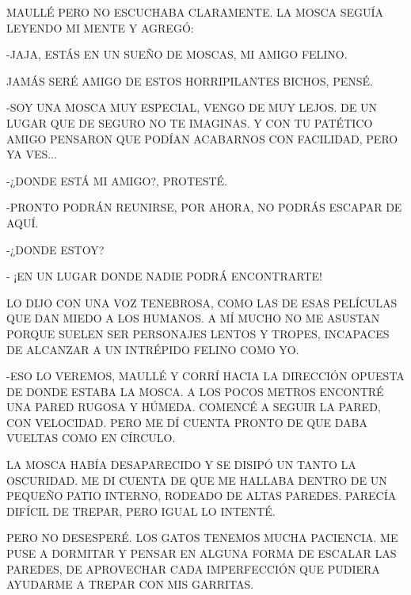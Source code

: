 MAULLÉ PERO NO ESCUCHABA CLARAMENTE. LA MOSCA SEGUÍA LEYENDO MI MENTE Y AGREGÓ:

-JAJA, ESTÁS EN UN SUEÑO DE MOSCAS, MI AMIGO FELINO.

JAMÁS SERÉ AMIGO DE ESTOS HORRIPILANTES BICHOS, PENSÉ. 

-SOY UNA MOSCA MUY ESPECIAL, VENGO DE MUY LEJOS. DE UN LUGAR QUE DE SEGURO NO TE IMAGINAS. Y CON TU PATÉTICO AMIGO PENSARON QUE PODÍAN ACABARNOS CON FACILIDAD, PERO YA VES$\ldots$

-¿DONDE ESTÁ MI AMIGO?, PROTESTÉ. 

-PRONTO PODRÁN REUNIRSE, POR AHORA, NO PODRÁS ESCAPAR DE AQUÍ.




\newpage
{}
-¿DONDE ESTOY?

- ¡EN UN LUGAR DONDE NADIE PODRÁ ENCONTRARTE!

LO DIJO CON UNA VOZ TENEBROSA, COMO LAS DE ESAS PELÍCULAS QUE DAN MIEDO A LOS HUMANOS. A MÍ MUCHO NO ME ASUSTAN PORQUE SUELEN SER PERSONAJES LENTOS Y TROPES, INCAPACES DE ALCANZAR A UN INTRÉPIDO FELINO COMO YO.

-ESO LO VEREMOS, MAULLÉ Y CORRÍ HACIA LA DIRECCIÓN OPUESTA DE DONDE ESTABA LA MOSCA. A LOS POCOS METROS ENCONTRÉ UNA PARED RUGOSA Y HÚMEDA. COMENCÉ A SEGUIR LA PARED, CON VELOCIDAD. PERO ME DÍ CUENTA PRONTO DE QUE DABA VUELTAS COMO EN CÍRCULO.

LA MOSCA HABÍA DESAPARECIDO Y SE DISIPÓ UN TANTO LA OSCURIDAD. ME DI CUENTA DE QUE ME HALLABA DENTRO DE UN PEQUEÑO PATIO INTERNO, RODEADO DE ALTAS PAREDES. PARECÍA DIFÍCIL DE TREPAR, PERO IGUAL LO INTENTÉ.

\newpage
{}
PERO NO DESESPERÉ. LOS GATOS TENEMOS MUCHA PACIENCIA. ME PUSE A DORMITAR Y PENSAR EN ALGUNA FORMA DE ESCALAR LAS PAREDES, DE APROVECHAR CADA IMPERFECCIÓN QUE PUDIERA AYUDARME A TREPAR CON MIS GARRITAS. 


